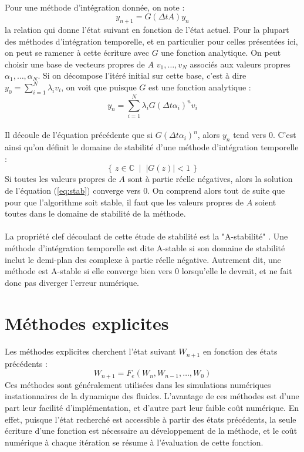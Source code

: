   \paragraph{}
  Pour une méthode d'intégration donnée, on note :
  $$y_{n+1} = G\left(\Delta tA\right)y_n$$
  la relation qui donne l'état suivant en fonction de l'état actuel.
  Pour la plupart des méthodes d'intégration temporelle, et en particulier pour celles présentées ici, on peut se ramener à cette écriture avec $G$ une fonction analytique.
  On peut choisir une base de vecteurs propres de $A$ $v_1, \dots, v_N$ associés aux valeurs propres $\alpha_1, \dots, \alpha_N$.
  Si on décompose l'itéré initial sur cette base, c'est à dire $y_0 = \sum_{i=1}^N\lambda_iv_i$, on voit que puisque $G$ est une fonction analytique :
  $$y_n = \sum_{i=1}^N\lambda_iG\left(\Delta t\alpha_i\right)^nv_i$$

  \paragraph{}
  Il découle de l'équation précédente que si $G\left(\Delta t\alpha_i\right)^n$, alors $y_n$ tend vers 0.
  C'est ainsi qu'on définit le domaine de stabilité d'une méthode d'intégration temporelle :
  $$\left\{\,z\in\mathbb{C}\;\mid\;\left|G\left(z\right)\right| < 1\,\right\}$$
  Si toutes les valeurs propres de $A$ sont à partie réelle négatives, alors la solution de l'équation (\ref{eq:stab}) converge vers 0.
  On comprend alors tout de suite que pour que l'algorithme soit stable, il faut que les valeurs propres de $A$ soient toutes dans le domaine de stabilité de la méthode.

  \paragraph{}
  La propriété clef découlant de cette étude de stabilité est la "A-stabilité" \cite{Dahlquist1963}.
  Une méthode d'intégration temporelle est dite A-stable si son domaine de stabilité inclut le demi-plan des complexe à partie réelle négative.
  Autrement dit, une méthode est A-stable si elle converge bien vers 0 lorsqu'elle le devrait, et ne fait donc pas diverger l'erreur numérique.


\section{Méthodes explicites}

  \paragraph{}
  Les méthodes explicites cherchent l'état suivant $W_{n+1}$ en fonction des états précédents :
  $$W_{n+1} = F_e\left(W_n, W_{n-1}, \dots, W_0\right)$$
  Ces méthodes sont généralement utilisées dans les simulations numériques instationnaires de la dynamique des fluides.
  L'avantage de ces méthodes est d'une part leur facilité d'implémentation, et d'autre part leur faible coût numérique.
  En effet, puisque l'état recherché est accessible à partir des états précédents, la seule écriture d'une fonction est nécessaire au développement de la méthode, et le coût numérique à chaque itération se résume à l'évaluation de cette fonction.

